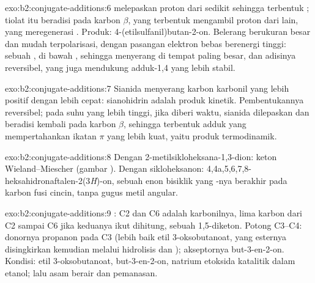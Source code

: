 \begin{solution}{exo:b2:conjugate-additions:6}
 melepaskan proton dari sedikit  sehingga terbentuk
; tiolat itu beradisi pada karbon $\beta$,  yang terbentuk
mengambil proton dari  lain, yang meregenerasi . Produk:
4-(etilsulfanil)butan-2-on. Belerang berukuran besar dan mudah
terpolarisasi, dengan pasangan elektron bebas berenergi tinggi: sebuah
, di bawah , sehingga menyerang di tempat 
paling besar, dan adisinya reversibel, yang juga mendukung adduk-1,4 yang
lebih stabil.
\end{solution}

\begin{solution}{exo:b2:conjugate-additions:7}
Sianida menyerang karbon karbonil yang lebih positif dengan lebih cepat:
sianohidrin adalah produk kinetik. Pembentukannya reversibel; pada suhu yang
lebih tinggi, jika diberi waktu, sianida dilepaskan dan beradisi kembali
pada karbon $\beta$, sehingga terbentuk adduk yang mempertahankan ikatan $\pi$
 yang lebih kuat, yaitu produk termodinamik.
\end{solution}

\begin{solution}{exo:b2:conjugate-additions:8}
Dengan 2-metilsikloheksana-1,3-dion: keton Wieland--Miescher (gambar ). Dengan sikloheksanon: 4,4a,5,6,7,8-heksahidronaftalen-2(3\textit{H})-on,
sebuah enon bisiklik yang -nya berakhir pada karbon fusi cincin,
tanpa gugus metil angular.
\end{solution}

\begin{solution}{exo:b2:conjugate-additions:9}
: C2 dan C6 adalah karbonilnya, lima karbon dari C2
sampai C6 jika keduanya ikut dihitung, sebuah 1,5-diketon. Potong C3--C4:
donornya  propanon pada C3 (lebih baik etil 3-oksobutanoat, yang
esternya disingkirkan kemudian melalui hidrolisis dan );
akseptornya but-3-en-2-on. Kondisi: etil 3-oksobutanoat, but-3-en-2-on,
natrium etoksida katalitik dalam etanol; lalu asam berair dan pemanasan.
\end{solution}

